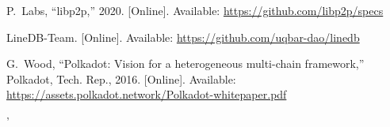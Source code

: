 \documentclass[14pt]{article}
\begin{document}
\begin{thebibliography}{10}
\BIBentryALTinterwordspacing
P.~Labs, ``libp2p,'' 2020. [Online]. Available:
  \url{https://github.com/libp2p/specs}
\BIBentrySTDinterwordspacing

\BIBentryALTinterwordspacing
LineDB-Team. [Online]. Available: \url{https://github.com/uqbar-dao/linedb}
\BIBentrySTDinterwordspacing

\BIBentryALTinterwordspacing
G.~Wood, ``Polkadot: Vision for a heterogeneous multi-chain framework,''
  Polkadot, Tech. Rep., 2016. [Online]. Available:
  \url{https://assets.polkadot.network/Polkadot-whitepaper.pdf}
\BIBentrySTDinterwordspacing

\end{thebibliography}
'
\end{document}
